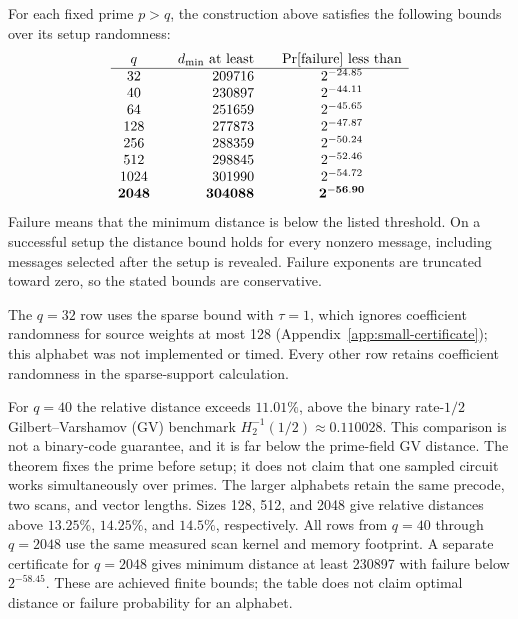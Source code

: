 \begin{theorem}\label{thm:small-scans}
For each fixed prime $p>q$, the construction above satisfies the
following bounds over its setup randomness:
\[
\begin{array}{c@{\qquad}r@{\qquad}c}
 q & d_{\min}\text{ at least}
   & \Pr[\text{failure}]\text{ less than}\\ \hline
 32 & 209716 & 2^{-24.85}\\
 40 & 230897 & 2^{-44.11}\\
 64 & 251659 & 2^{-45.65}\\
 128 & 277873 & 2^{-47.87}\\
 256 & 288359 & 2^{-50.24}\\
 512 & 298845 & 2^{-52.46}\\
 1024 & 301990 & 2^{-54.72}\\
 \mathbf{2048} & \mathbf{304088} & \mathbf{2^{-56.90}}
\end{array}
\]
Failure means that the minimum distance is below the listed threshold.
On a successful setup the distance bound holds for every nonzero message,
including messages selected after the setup is revealed. Failure
exponents are truncated toward zero, so the stated bounds are
conservative.
\end{theorem}

The $q=32$ row uses the sparse bound with $\tau=1$, which ignores
coefficient randomness for source weights at most 128
(Appendix~\ref{app:small-certificate}); this alphabet was not implemented
or timed. Every other row retains coefficient randomness in the
sparse-support calculation.

For $q=40$ the relative distance exceeds $11.01\%$, above the binary
rate-$1/2$ Gilbert--Varshamov (GV) benchmark $H_2^{-1}(1/2)\approx0.110028$.
This comparison is not a binary-code guarantee, and it is far below the
prime-field GV distance. The theorem fixes the prime before setup; it
does not claim that one sampled circuit works simultaneously over primes.
The larger alphabets retain the same precode, two scans, and vector
lengths. Sizes 128, 512, and 2048 give relative distances above
$13.25\%$, $14.25\%$, and $14.5\%$, respectively. All rows from
$q=40$ through $q=2048$ use the same measured scan kernel and memory
footprint. A separate certificate for $q=2048$ gives minimum distance
at least 230897 with failure below $2^{-58.45}$. These are achieved
finite bounds; the table does not claim optimal distance or failure
probability for an alphabet.

